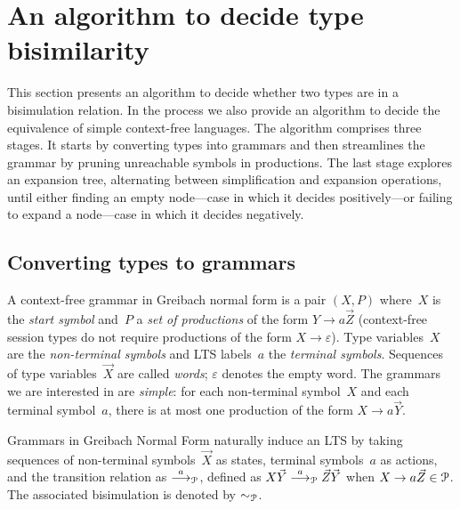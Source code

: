 \section{An algorithm to decide type bisimilarity}
\label{sec:algorithm}



This section presents an algorithm to decide whether two types are in
a bisimulation relation. In the process we also provide an algorithm
to decide the equivalence of simple context-free languages.
%
The algorithm comprises three stages. It
starts by converting types into grammars and then streamlines the
grammar by pruning unreachable symbols in productions. The last stage
explores an expansion tree, alternating between simplification and
expansion operations, until either finding an empty node---case in
which it decides positively---or failing to expand a node---case in
which it decides negatively.

\subsection{Converting types to grammars}
\label{subsec:typeToGrammar}

A context-free grammar in Greibach normal form is a pair $(X,P)$
where~$X$ is the \emph{start symbol} and~$P$ a \emph{set of
  productions} of the form $Y \rightarrow a\vec Z$ (context-free
session types do not require productions of the form
$X \rightarrow\varepsilon$). Type variables~$X$ are the
\emph{non-terminal symbols} and LTS labels~$a$ the \emph{terminal
  symbols}. Sequences of type variables~$\vec X$ are called
\emph{words}; $\varepsilon$ denotes the empty word.
%
The grammars we are interested in are \emph{simple}: for each
non-terminal symbol~$X$ and each terminal symbol~$a$, there is at most
one production of the form $X \rightarrow a\vec Y$.

Grammars in Greibach Normal Form naturally induce an LTS by taking
sequences of non-terminal symbols~$\vec X$ as states, terminal
symbols~$a$ as actions, and the transition relation as $\stackrel{a}{\longrightarrow}_\mathcal P$,
defined as $X\vec Y\stackrel{a}{\longrightarrow}_\mathcal P \vec Z\vec Y$ when
$X \rightarrow a\vec Z \in\mathcal P$.
The associated bisimulation is denoted by $\sim_\mathcal P$.

